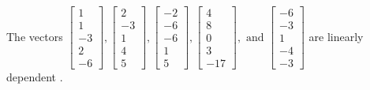 \begin{exercise}
\begin{exerciseStatement}
  \end{exerciseStatement}
  \begin{exerciseAnswer}
   The vectors \(\left[\begin{array}{r}
1 \\
1 \\
-3 \\
2 \\
-6
\end{array}\right] , \left[\begin{array}{r}
2 \\
-3 \\
1 \\
4 \\
5
\end{array}\right] , \left[\begin{array}{r}
-2 \\
-6 \\
-6 \\
1 \\
5
\end{array}\right] , \left[\begin{array}{r}
4 \\
8 \\
0 \\
3 \\
-17
\end{array}\right] , \text{ and } \left[\begin{array}{r}
-6 \\
-3 \\
1 \\
-4 \\
-3
\end{array}\right]\) are 
  	 linearly dependent  .
  


  \end{exerciseAnswer}
\end{exercise}